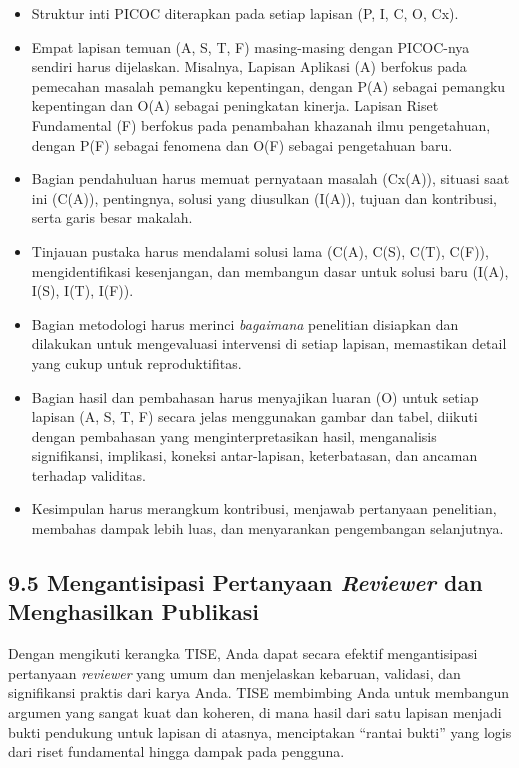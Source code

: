 \documentclass[
  letterpaper,
  DIV=11,
  numbers=noendperiod]{scrreprt}
\providecommand{\tightlist}{%
  \setlength{\itemsep}{0pt}\setlength{\parskip}{0pt}}
\begin{document}
\begin{itemize}
  \begin{itemize}
  \tightlist
  \item
    Struktur inti PICOC diterapkan pada setiap lapisan (P, I, C, O, Cx).
  \item
    Empat lapisan temuan (A, S, T, F) masing-masing dengan PICOC-nya
    sendiri harus dijelaskan. Misalnya, Lapisan Aplikasi (A) berfokus
    pada pemecahan masalah pemangku kepentingan, dengan P(A) sebagai
    pemangku kepentingan dan O(A) sebagai peningkatan kinerja. Lapisan
    Riset Fundamental (F) berfokus pada penambahan khazanah ilmu
    pengetahuan, dengan P(F) sebagai fenomena dan O(F) sebagai
    pengetahuan baru.
  \item
    Bagian pendahuluan harus memuat pernyataan masalah (Cx(A)), situasi
    saat ini (C(A)), pentingnya, solusi yang diusulkan (I(A)), tujuan
    dan kontribusi, serta garis besar makalah.
  \item
    Tinjauan pustaka harus mendalami solusi lama (C(A), C(S), C(T),
    C(F)), mengidentifikasi kesenjangan, dan membangun dasar untuk
    solusi baru (I(A), I(S), I(T), I(F)).
  \item
    Bagian metodologi harus merinci \emph{bagaimana} penelitian
    disiapkan dan dilakukan untuk mengevaluasi intervensi di setiap
    lapisan, memastikan detail yang cukup untuk reproduktifitas.
  \item
    Bagian hasil dan pembahasan harus menyajikan luaran (O) untuk setiap
    lapisan (A, S, T, F) secara jelas menggunakan gambar dan tabel,
    diikuti dengan pembahasan yang menginterpretasikan hasil,
    menganalisis signifikansi, implikasi, koneksi antar-lapisan,
    keterbatasan, dan ancaman terhadap validitas.
  \item
    Kesimpulan harus merangkum kontribusi, menjawab pertanyaan
    penelitian, membahas dampak lebih luas, dan menyarankan pengembangan
    selanjutnya.
  \end{itemize}
\end{itemize}

\subsection{\texorpdfstring{\textbf{9.5 Mengantisipasi Pertanyaan
\emph{Reviewer} dan Menghasilkan
Publikasi}}{9.5 Mengantisipasi Pertanyaan Reviewer dan Menghasilkan Publikasi}}\label{mengantisipasi-pertanyaan-reviewer-dan-menghasilkan-publikasi}

Dengan mengikuti kerangka TISE, Anda dapat secara efektif mengantisipasi
pertanyaan \emph{reviewer} yang umum dan menjelaskan kebaruan, validasi,
dan signifikansi praktis dari karya Anda. TISE membimbing Anda untuk
membangun argumen yang sangat kuat dan koheren, di mana hasil dari satu
lapisan menjadi bukti pendukung untuk lapisan di atasnya, menciptakan
``rantai bukti'' yang logis dari riset fundamental hingga dampak pada
pengguna.
\end{document}
